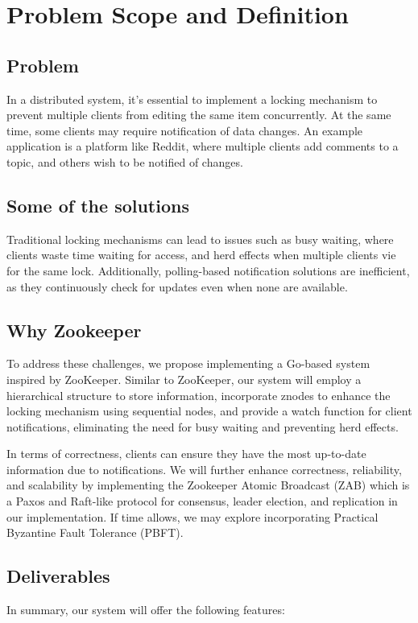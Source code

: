 \documentclass[
course = 50.041,
assignmenttype = {{Jaguard}},
assignment = {{}},
name = {{Group 5}},
studentnumber = {{Report}}
]{style}
\begin{document}
\section{Problem Scope and Definition}
\subsection{Problem}
In a distributed system, it's essential to implement a locking mechanism to prevent multiple clients from editing the same item concurrently. At the same time, some clients may require notification of data changes. An example application is a platform like Reddit, where multiple clients add comments to a topic, and others wish to be notified of changes.

\subsection{Some of the solutions}
Traditional locking mechanisms can lead to issues such as busy waiting, where clients waste time waiting for access, and herd effects when multiple clients vie for the same lock. Additionally, polling-based notification solutions are inefficient, as they continuously check for updates even when none are available.

\subsection{Why Zookeeper}
To address these challenges, we propose implementing a Go-based system inspired by ZooKeeper. Similar to ZooKeeper, our system will employ a hierarchical structure to store information, incorporate znodes to enhance the locking mechanism using sequential nodes, and provide a watch function for client notifications, eliminating the need for busy waiting and preventing herd effects.

In terms of correctness, clients can ensure they have the most up-to-date information due to notifications. We will further enhance correctness, reliability, and scalability by implementing the Zookeeper Atomic Broadcast (ZAB) which is a Paxos and Raft-like protocol for consensus, leader election, and replication in our implementation. If time allows, we may explore incorporating Practical Byzantine Fault Tolerance (PBFT).

\subsection{Deliverables}
In summary, our system will offer the following features:
\end{document}
